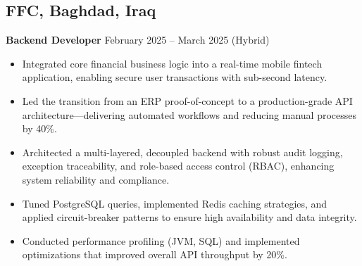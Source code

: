 \documentclass[11pt]{article}
\begin{document}
\subsection*{FFC, Baghdad, Iraq}
\textbf{Backend Developer} \hfill February 2025 -- March 2025 (Hybrid)\\
\begin{itemize}[leftmargin=*]\itemsep0pt
  \item Integrated core financial business logic into a real-time mobile fintech application, enabling secure user transactions with sub-second latency.
  \item Led the transition from an ERP proof-of-concept to a production-grade API architecture—delivering automated workflows and reducing manual processes by 40\%.
  \item Architected a multi-layered, decoupled backend with robust audit logging, exception traceability, and role-based access control (RBAC), enhancing system reliability and compliance.
  \item Tuned PostgreSQL queries, implemented Redis caching strategies, and applied circuit-breaker patterns to ensure high availability and data integrity.
  \item Conducted performance profiling (JVM, SQL) and implemented optimizations that improved overall API throughput by 20\%.
\end{itemize}

\vspace{0.2cm}
\end{document}
